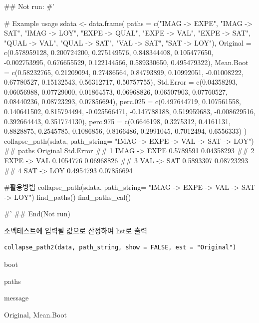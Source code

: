 \documentclass[a4paper]{book}
\begin{document}
%
\begin{Examples}
\begin{ExampleCode}


## Not run: 
#'

# Example usage
sdata <- data.frame(
  paths = c("IMAG -> EXPE", "IMAG -> SAT", "IMAG -> LOY",
   "EXPE -> QUAL", "EXPE -> VAL", "EXPE -> SAT",
            "QUAL -> VAL", "QUAL -> SAT",
            "VAL -> SAT", "SAT -> LOY"),
  Original = c(0.578959128, 0.200724200, 0.275149576,
   0.848344408, 0.105477650, -0.002753995,
               0.676655529, 0.122144566, 0.589330650, 0.495479322),
  Mean.Boot = c(0.58232765, 0.21209094, 0.27486564,
  0.84793899, 0.10992051, -0.01008222,
                0.67780527, 0.15132543, 0.56312717, 0.50757755),
  Std.Error = c(0.04358293, 0.06056988, 0.07729000,
  0.01864573, 0.06968826, 0.06507903,
                0.07760527, 0.08440236, 0.08723293, 0.07856694),
  perc.025 = c(0.497644719, 0.107561558, 0.140641502,
   0.815794494, -0.025566471, -0.147788188,
               0.519959683, -0.008629516, 0.392664443, 0.351774130),
  perc.975 = c(0.6646198, 0.3275312, 0.4161131,
   0.8828875, 0.2545785, 0.1086856,
               0.8166486, 0.2991045, 0.7012494, 0.6556333)
)
collapse_path(sdata, path_string= "IMAG -> EXPE -> VAL -> SAT -> LOY")
## paths  Original  Std.Error
## 1 IMAG -> EXPE 0.5789591 0.04358293
## 2  EXPE -> VAL 0.1054776 0.06968826
## 3   VAL -> SAT 0.5893307 0.08723293
## 4   SAT -> LOY 0.4954793 0.07856694


#활용방법
collapse_path(sdata,
path_string= "IMAG -> EXPE -> VAL -> SAT -> LOY")%
find_paths()%
find_paths_cal()

#' 
## End(Not run)

\end{ExampleCode}
\end{Examples}
%
\begin{Description}
소벡테스트에 입력될 값으로 산정하여 list로 출력
\end{Description}
%
\begin{Usage}
\begin{verbatim}
collapse_path2(data, path_string, show = FALSE, est = "Original")
\end{verbatim}
\end{Usage}
%
\begin{Arguments}
\begin{ldescription}
\item[\code{data}] boot

\item[\code{path\_string}] paths

\item[\code{show}] message

\item[\code{est}] Original, Mean.Boot
\end{ldescription}
\end{Arguments}
\end{document}

